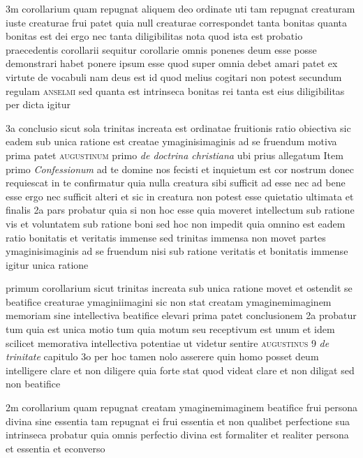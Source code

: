 \documentclass[twoside, openright]{article}
\newcommand{\name}[1]{\textsc{#1}}
\newcommand{\worktitle}[1]{\textit{#1}}
\begin{document}
        \pstart
        3m corollarium quam repugnat aliquem deo ordinate uti tam repugnat creaturam iuste creaturae frui patet quia null creaturae correspondet tanta bonitas quanta bonitas est dei ergo nec tanta diligibilitas  nota quod ista est probatio praecedentis corollarii sequitur corollarie omnis ponenes deum esse posse demonstrari habet ponere ipsum esse quod super omnia debet amari patet ex virtute de vocabuli nam deus est id quod melius cogitari non potest secundum regulam \name{anselmi} sed quanta est intrinseca bonitas rei tanta est eius diligibilitas per dicta igitur
        \pend
     
        \pstart
        3a conclusio sicut sola trinitas increata est ordinatae fruitionis ratio obiectiva sic eadem sub unica ratione est creatae ymaginisimaginis ad se fruendum motiva prima patet  \name{augustinum} primo \worktitle{de doctrina christiana} ubi prius allegatum Item primo \worktitle{Confessionum} ad te domine nos fecisti et inquietum est cor nostrum donec requiescat in te confirmatur quia nulla creatura sibi sufficit ad esse nec ad bene esse ergo nec sufficit alteri et sic in creatura non potest esse quietatio ultimata et finalis  2a pars probatur quia si non hoc esse quia moveret intellectum sub ratione vis et voluntatem sub ratione boni sed hoc non impedit quia omnino est eadem ratio bonitatis et veritatis immense sed trinitas immensa non movet partes ymaginisimaginis ad se fruendum nisi sub ratione veritatis et bonitatis immense igitur unica ratione
        \pend
     
        \pstart
        primum corollarium sicut trinitas increata sub unica ratione movet et ostendit se beatifice creaturae ymaginiimagini sic non stat creatam ymaginemimaginem memoriam sine intellectiva beatifice elevari prima patet conclusionem 2a probatur tum quia est unica motio  tum quia motum seu receptivum est unum et idem scilicet memorativa intellectiva potentiae ut videtur sentire \name{augustinus} 9 \worktitle{de trinitate} capitulo 3o  per hoc tamen nolo asserere quin homo posset deum intelligere clare et non diligere quia forte stat quod videat clare et non diligat sed non beatifice
        \pend
     
        \pstart
        2m corollarium quam repugnat creatam ymaginemimaginem beatifice frui persona divina sine essentia tam repugnat ei frui essentia et non qualibet perfectione sua intrinseca probatur quia omnis perfectio divina est formaliter et realiter persona et essentia et econverso
        \pend
     
\end{document}
